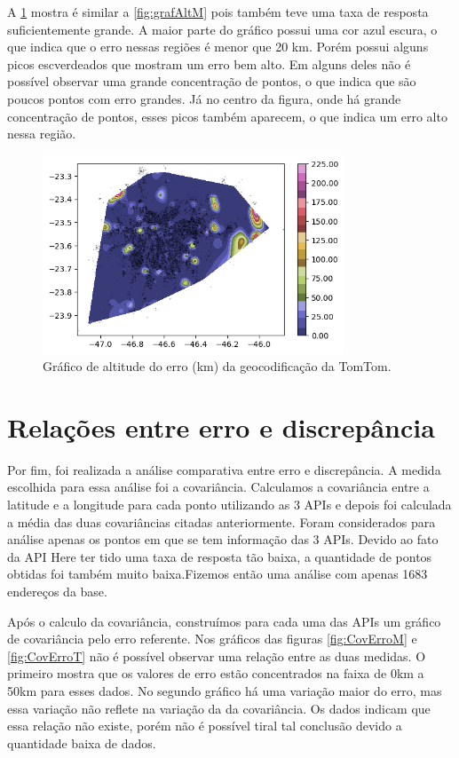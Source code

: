 A \ref{fig:grafAltT} mostra é similar a \ref{fig:grafAltM} pois também teve uma taxa de resposta suficientemente grande. A maior parte do gráfico possui uma cor azul escura, o que indica que o erro nessas regiões é menor que 20 km. Porém possui alguns picos escverdeados que mostram um erro bem alto. Em alguns deles não é possível observar uma grande concentração de pontos, o que indica que são poucos pontos com erro grandes. Já no centro da figura, onde há grande concentração de pontos, esses picos também aparecem, o que indica um erro alto nessa região.
\begin{figure}[h]
  \centering
  \includegraphics[width=0.8\textwidth]{Figuras/graficoAltPontosTomtom.png}
  \caption{Gráfico de altitude do erro (km) da geocodificação da TomTom.}
  \label{fig:grafAltT}
\end{figure}

\section{Relações entre erro e discrepância}
Por fim, foi realizada a análise comparativa entre erro e discrepância. A medida escolhida para essa análise foi a covariância. Calculamos a covariância entre a latitude e a longitude para cada ponto utilizando as 3 APIs e depois foi calculada a média das duas covariâncias citadas anteriormente. Foram considerados para análise apenas os pontos em que se tem informação das 3 APIs. Devido ao fato da API Here ter tido uma taxa de resposta tão baixa, a quantidade de pontos obtidas foi também muito baixa.Fizemos então uma análise com apenas 1683 endereços da base. 

Após o calculo da covariância, construímos para cada uma das APIs um gráfico de covariância pelo erro referente. Nos gráficos das figuras \ref{fig:CovErroM} e \ref{fig:CovErroT} não é possível observar uma relação entre as duas medidas. O primeiro mostra que os valores de erro estão concentrados na faixa de 0km a 50km para esses dados. No segundo gráfico há uma variação maior do erro, mas essa variação não reflete na variação da da covariância. Os dados indicam que essa relação não existe, porém não é possível tiral tal conclusão devido a quantidade baixa de dados. 

